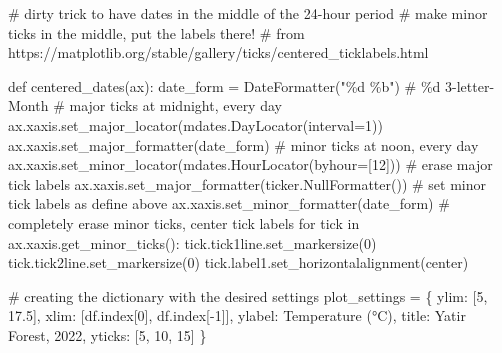 \documentclass[
  letterpaper,
  DIV=11,
  numbers=noendperiod,
  oneside]{scrreprt}
\newenvironment{Shaded}{\begin{snugshade}}{\end{snugshade}}
\newcommand{\CommentTok}[1]{\textcolor[rgb]{0.37,0.37,0.37}{#1}}
\newcommand{\ControlFlowTok}[1]{\textcolor[rgb]{0.00,0.23,0.31}{#1}}
\newcommand{\DecValTok}[1]{\textcolor[rgb]{0.68,0.00,0.00}{#1}}
\newcommand{\FloatTok}[1]{\textcolor[rgb]{0.68,0.00,0.00}{#1}}
\newcommand{\KeywordTok}[1]{\textcolor[rgb]{0.00,0.23,0.31}{#1}}
\newcommand{\NormalTok}[1]{\textcolor[rgb]{0.00,0.23,0.31}{#1}}
\newcommand{\OperatorTok}[1]{\textcolor[rgb]{0.37,0.37,0.37}{#1}}
\newcommand{\SpecialCharTok}[1]{\textcolor[rgb]{0.37,0.37,0.37}{#1}}
\newcommand{\StringTok}[1]{\textcolor[rgb]{0.13,0.47,0.30}{#1}}
\begin{document}
\begin{Shaded}
\begin{Highlighting}[]
\CommentTok{\# dirty trick to have dates in the middle of the 24{-}hour period}
\CommentTok{\# make minor ticks in the middle, put the labels there!}
\CommentTok{\# from https://matplotlib.org/stable/gallery/ticks/centered\_ticklabels.html}

\KeywordTok{def}\NormalTok{ centered\_dates(ax):}
\NormalTok{    date\_form }\OperatorTok{=}\NormalTok{ DateFormatter(}\StringTok{"}\SpecialCharTok{\%d}\StringTok{ \%b"}\NormalTok{)  }\CommentTok{\# \%d 3{-}letter{-}Month}
    \CommentTok{\# major ticks at midnight, every day}
\NormalTok{    ax.xaxis.set\_major\_locator(mdates.DayLocator(interval}\OperatorTok{=}\DecValTok{1}\NormalTok{))}
\NormalTok{    ax.xaxis.set\_major\_formatter(date\_form)}
    \CommentTok{\# minor ticks at noon, every day}
\NormalTok{    ax.xaxis.set\_minor\_locator(mdates.HourLocator(byhour}\OperatorTok{=}\NormalTok{[}\DecValTok{12}\NormalTok{]))}
    \CommentTok{\# erase major tick labels}
\NormalTok{    ax.xaxis.set\_major\_formatter(ticker.NullFormatter())}
    \CommentTok{\# set minor tick labels as define above}
\NormalTok{    ax.xaxis.set\_minor\_formatter(date\_form)}
    \CommentTok{\# completely erase minor ticks, center tick labels}
    \ControlFlowTok{for}\NormalTok{ tick }\KeywordTok{in}\NormalTok{ ax.xaxis.get\_minor\_ticks():}
\NormalTok{        tick.tick1line.set\_markersize(}\DecValTok{0}\NormalTok{)}
\NormalTok{        tick.tick2line.set\_markersize(}\DecValTok{0}\NormalTok{)}
\NormalTok{        tick.label1.set\_horizontalalignment(}\StringTok{\textquotesingle{}center\textquotesingle{}}\NormalTok{)}

\CommentTok{\# creating the dictionary with the desired settings}
\NormalTok{plot\_settings }\OperatorTok{=}\NormalTok{ \{}
    \StringTok{\textquotesingle{}ylim\textquotesingle{}}\NormalTok{: [}\DecValTok{5}\NormalTok{, }\FloatTok{17.5}\NormalTok{],}
    \StringTok{\textquotesingle{}xlim\textquotesingle{}}\NormalTok{: [df.index[}\DecValTok{0}\NormalTok{], df.index[}\OperatorTok{{-}}\DecValTok{1}\NormalTok{]],}
    \StringTok{\textquotesingle{}ylabel\textquotesingle{}}\NormalTok{: }\StringTok{\textquotesingle{}Temperature (°C)\textquotesingle{}}\NormalTok{,}
    \StringTok{\textquotesingle{}title\textquotesingle{}}\NormalTok{: }\StringTok{\textquotesingle{}Yatir Forest, 2022\textquotesingle{}}\NormalTok{,}
    \StringTok{\textquotesingle{}yticks\textquotesingle{}}\NormalTok{: [}\DecValTok{5}\NormalTok{, }\DecValTok{10}\NormalTok{, }\DecValTok{15}\NormalTok{]}
\NormalTok{\}}
\end{Highlighting}
\end{Shaded}
\end{document}
